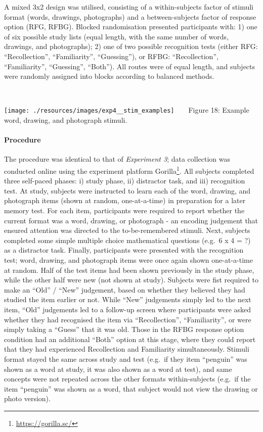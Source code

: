 \documentclass[
  11pt,
]{article}
\begin{document}
A mixed 3x2 design was utilised, consisting of a within-subjects factor
of stimuli format (words, drawings, photographs) and a between-subjects
factor of response option (RFG, RFBG). Blocked randomisation presented
participants with: 1) one of six possible study lists (equal length,
with the same number of words, drawings, and photographs); 2) one of two
possible recognition tests (either RFG: ``Recollection'',
``Familiarity'', ``Guessing''), or RFBG: ``Recollection'',
``Familiarity'', ``Guessing'', ``Both''). All routes were of equal
length, and subjects were randomly assigned into blocks according to
balanced methods.

~ ~

\texttt{[image: ./resources/images/exp4\_\_stim\_examples]}
~ ~ Figure 18: Example word, drawing, and photograph stimuli. ~ ~

\hypertarget{procedure-3}{%
\paragraph{Procedure}\label{procedure-3}}

The procedure was identical to that of \emph{Experiment 3}; data
collection was conducted online using the experiment platform
Gorilla\footnote{\url{https://gorilla.sc/}}. All subjects completed
three self-paced phases: i) study phase, ii) distractor task, and iii)
recognition test. At study, subjects were instructed to learn each of
the word, drawing, and photograph items (shown at random, one-at-a-time)
in preparation for a later memory test. For each item, participants were
required to report whether the current format was a word, drawing, or
photograph - an encoding judgement that ensured attention was directed
to the to-be-remembered stimuli. Next, subjects completed some simple
multiple choice mathematical questions (e.g.~6 x 4 = ?) as a distractor
task. Finally, participants were presented with the recognition test;
word, drawing, and photograph items were once again shown one-at-a-time
at random. Half of the test items had been shown previously in the study
phase, while the other half were new (not shown at study). Subjects were
fist required to make an ``Old'' / ``New'' judgement, based on whether
they believed they had studied the item earlier or not. While ``New''
judgements simply led to the next item, ``Old'' judgements led to a
follow-up screen where participants were asked whether they had
recognised the item via ``Recollection'', ``Familiarity'', or were
simply taking a ``Guess'' that it was old. Those in the RFBG response
option condition had an additional ``Both'' option at this stage, where
they could report that they had experienced Recollection and Familiarity
simultaneously. Stimuli format stayed the same across study and test
(e.g.~if they item ``penguin'' was shown as a word at study, it was also
shown as a word at test), and same concepts were not repeated across the
other formats within-subjects (e.g.~if the item ``penguin'' was shown as
a word, that subject would not view the drawing or photo version).
\end{document}
